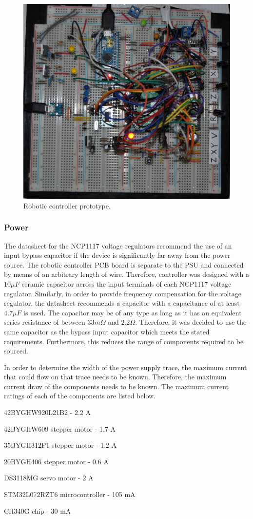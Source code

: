 \begin{figure}[H]
	\centering
	\includegraphics[width=0.7\linewidth]{figures/202109/robotic-controller-prototype.JPG}
	\caption{Robotic controller prototype.}
	\label{fig:robotic-controller-prototype}
\end{figure}


\subsubsection{Power}
The datasheet for the NCP1117 voltage regulators recommend the use of an input bypass capacitor if the device is significantly far away from the power source. The robotic controller PCB board is separate to the \ac{PSU} and connected by means of an arbitrary length of wire. Therefore, controller was designed with a $10\mu F$ ceramic 
capacitor across the input terminals of each NCP1117 voltage regulator. Similarly, in order to provide frequency compensation for the voltage regulator, the datasheet recommends a capacitor with a capacitance of at least $4.7\mu F$ is used. The capacitor may be of any type as long as it has an equivalent series resistance of between $33m\Omega$ and $2.2\Omega$. Therefore, it was decided to use the same capacitor as the bypass input capacitor which meets the stated requirements. Furthermore, this reduces the range of components required to be sourced.

In order to determine the width of the power supply trace, the maximum current that could flow on that trace needs to be known. Therefore, the maximum current draw of the components needs to be known. The maximum current ratings of each of the components are listed below.

\begin{compactitem}
	\item 42BYGHW920L21B2 - 2.2 A
	\item 42BYGHW609 stepper motor - 1.7 A
	\item 35BYGH312P1 stepper motor - 1.2 A
	\item 20BYGH406 stepper motor - 0.6 A
	\item DS3118MG servo motor - 2 A
	\item STM32L072RZT6 microcontroller - 105 mA
	\item CH340G chip - 30 mA
\end{compactitem}

